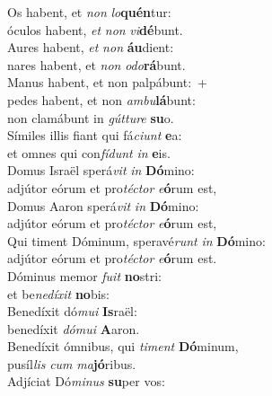 \oddverse Os habent, et \textit{non} \textit{lo}\textbf{quén}tur:~\*\\
\oddverse óculos habent, \textit{et} \textit{non} \textit{vi}\textbf{dé}bunt.\\
\evenverse Aures habent, \textit{et} \textit{non} \textbf{áu}dient:~\*\\
\evenverse nares habent, et \textit{non} \textit{o}\textit{do}\textbf{rá}bunt.\\
\oddverse Manus habent, et non palpábunt:~+\\
\oddverse  pedes habent, et non \textit{am}\textit{bu}\textbf{lá}bunt:~\*\\
\oddverse non clamábunt in \textit{gút}\textit{tu}\textit{re} \textbf{su}o.\\
\evenverse Símiles illis fiant qui fá\textit{ci}\textit{unt} \textbf{e}a:~\*\\
\evenverse et omnes qui con\textit{fí}\textit{dunt} \textit{in} \textbf{e}is.\\
\oddverse Domus Israël sperá\textit{vit} \textit{in} \textbf{Dó}mino:~\*\\
\oddverse adjútor eórum et pro\textit{té}\textit{ctor} \textit{e}\textbf{ó}rum est,\\
\evenverse Domus Aaron sperá\textit{vit} \textit{in} \textbf{Dó}mino:~\*\\
\evenverse adjútor eórum et pro\textit{té}\textit{ctor} \textit{e}\textbf{ó}rum est,\\
\oddverse Qui timent Dóminum, speravé\textit{runt} \textit{in} \textbf{Dó}mino:~\*\\
\oddverse adjútor eórum et pro\textit{té}\textit{ctor} \textit{e}\textbf{ó}rum est.\\
\evenverse Dóminus memor \textit{fu}\textit{it} \textbf{no}stri:~\*\\
\evenverse et be\textit{ne}\textit{dí}\textit{xit} \textbf{no}bis:\\
\oddverse Benedíxit dó\textit{mu}\textit{i} \textbf{Is}raël:~\*\\
\oddverse benedíxit \textit{dó}\textit{mu}\textit{i} \textbf{A}aron.\\
\evenverse Benedíxit ómnibus, qui \textit{ti}\textit{ment} \textbf{Dó}minum,~\*\\
\evenverse pusíl\textit{lis} \textit{cum} \textit{ma}\textbf{jó}ribus.\\
\oddverse Adjíciat Dó\textit{mi}\textit{nus} \textbf{su}per vos:~\*\\
